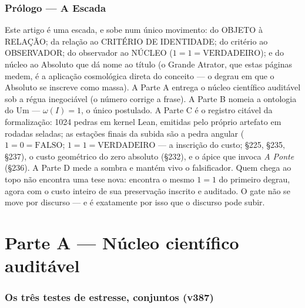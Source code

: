 \documentclass[11pt]{article}
\theoremstyle{definition}\newtheorem{deriv}{Derivação}
\begin{document}
\section*{Prólogo --- A Escada}

\noindent Este artigo é uma escada, e sobe num único movimento: do OBJETO à RELAÇÃO; da relação ao CRITÉRIO DE IDENTIDADE; do critério ao OBSERVADOR; do observador ao NÚCLEO ($1{=}1{=}\mathrm{VERDADEIRO}$); e do núcleo ao Absoluto que dá nome ao título (o Grande Atrator, que estas páginas medem, é a aplicação cosmológica direta do conceito --- o degrau em que o Absoluto se inscreve como massa). A Parte A entrega o núcleo científico auditável sob a régua inegociável (o número corrige a frase). A Parte B nomeia a ontologia do Um --- $\omega(I){=}1$, o único postulado. A Parte C é o registro citável da formalização: 1024 pedras em kernel Lean, emitidas pelo próprio artefato em rodadas seladas; as estações finais da subida são a pedra angular ($1{=}0{=}\mathrm{FALSO}$; $1{=}1{=}\mathrm{VERDADEIRO}$ --- a inscrição do custo; \S225, \S235, \S237), o custo geométrico do zero absoluto (\S232), e o ápice que invoca \emph{A Ponte} (\S236). A Parte D mede a sombra e mantém vivo o falsificador. Quem chega ao topo não encontra uma tese nova: encontra o mesmo $1{=}1$ do primeiro degrau, agora com o custo inteiro de sua preservação inscrito e auditado. O gate não se move por discurso --- e é exatamente por isso que o discurso pode subir.

\part{Parte A --- Núcleo científico auditável}

\section*{Os três testes de estresse, conjuntos (v387)}

\end{document}
